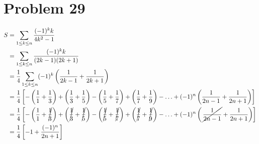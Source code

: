 \section*{Problem 29}
\begin{align*}
    S & = \sum_{1\leq k \leq n} \frac{(-1)^k k}{4k^2-1}                                                                                                                                                                                                                                                                          \\
      & = \sum_{1\leq k \leq n} \frac{(-1)^k k}{(2k-1)(2k+1)}                                                                                                                                                                                                                                                                    \\
      & = \frac{1}{4}\sum_{1\leq k \leq n} (-1)^k \left(\frac{1}{2k-1} + \frac{1}{2k+1}\right)                                                                                                                                                                                                                                   \\
      & =\frac{1}{4}\left[-\left(\frac{1}{1}+\frac{1}{3}\right) + \left(\frac{1}{3}+\frac{1}{5}\right)-\left(\frac{1}{5}+\frac{1}{7}\right) + \left(\frac{1}{7}+\frac{1}{9}\right) - \ldots + (-1)^n \left(\frac{1}{2n-1}+\frac{1}{2n+1}\right)\right]                                                                           \\
      & =\frac{1}{4}\left[-\left(\frac{1}{1}+\cancel{\frac{1}{3}}\right) + \left(\cancel{\frac{1}{3}}+\cancel{\frac{1}{5}}\right)-\left(\cancel{\frac{1}{5}}+\cancel{\frac{1}{7}}\right) + \left(\cancel{\frac{1}{7}}+\cancel{\frac{1}{9}}\right) - \ldots + (-1)^n \left(\,\cancel{\frac{1}{2n-1}}+\frac{1}{2n+1}\right)\right] \\
      & =\frac{1}{4}\left[-1 + \frac{(-1)^n}{2n+1}\right]
\end{align*}

